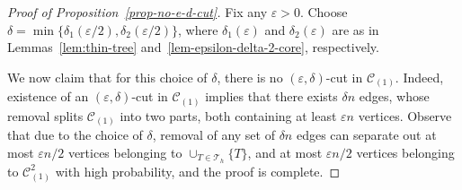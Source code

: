 \documentclass[11pt,a4paper, reqno]{article}
\numberwithin{equation}{section}
\numberwithin{equation}{section}
\def\sss{\scriptscriptstyle}
\newcommand{\1}{\ensuremath{\mathbbm{1}}}
\numberwithin{equation}{section}
\numberwithin{theorem}{section}
\begin{document}
\begin{proof}[Proof of Proposition~\ref{prop-no-e-d-cut}]
Fix any $\varepsilon>0$.
Choose $\delta = \min\{\delta_1(\varepsilon/2), \delta_2(\varepsilon/2)\}$, where $\delta_1(\varepsilon)$ and $\delta_2(\varepsilon)$ are as in Lemmas~\ref{lem:thin-tree} and~\ref{lem-epsilon-delta-2-core}, respectively.

We now claim that for this choice of $\delta$, there is no $(\varepsilon,\delta)$-cut in $\mathscr{C}_{\sss (1)}$.
Indeed, existence of an $(\varepsilon,\delta)$-cut in $\mathscr{C}_{\sss (1)}$ implies that there exists $\delta n$ edges, whose removal splits $\mathscr{C}_{\sss (1)}$ into two parts, both containing at least $\varepsilon n$ vertices.
Observe that due to the choice of $\delta$, removal of any set of $\delta n$
edges can separate out at most $\varepsilon n/2$ vertices belonging to $\cup_{T\in\mathcal{T}_h}\{T\}$, and at most $\varepsilon n/2$ vertices belonging to $\mathscr{C}_{\sss (1)}^2 $  with high probability, and the proof is complete.
\end{proof}
 
 
\end{document}
